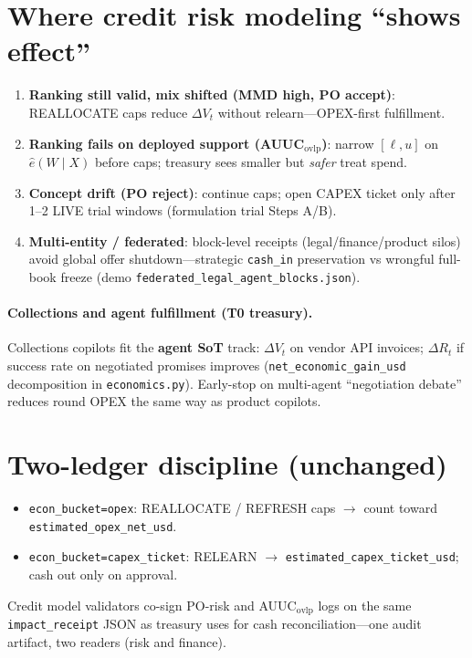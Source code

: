 \documentclass[11pt]{article}
\begin{document}
\section{Where credit risk modeling ``shows effect''}
\begin{enumerate}[nosep]
  \item \textbf{Ranking still valid, mix shifted (MMD high, PO accept)}: REALLOCATE caps reduce $\Delta V_t$ without relearn---OPEX-first fulfillment.
  \item \textbf{Ranking fails on deployed support (AUUC$_{\mathrm{ovlp}}$)}: narrow $[\ell,u]$ on $\hat e(W\mid X)$ before caps; treasury sees smaller but \emph{safer} treat spend.
  \item \textbf{Concept drift (PO reject)}: continue caps; open CAPEX ticket only after 1--2 LIVE trial windows (formulation trial Steps A/B).
  \item \textbf{Multi-entity / federated}: block-level receipts (legal/finance/product silos) avoid global offer shutdown---strategic \texttt{cash\_in} preservation vs wrongful full-book freeze (demo \texttt{federated\_legal\_agent\_blocks.json}).
\end{enumerate}

\paragraph{Collections and agent fulfillment (T0 treasury).}
Collections copilots fit the \textbf{agent SoT} track: $\Delta V_t$ on vendor API invoices; $\Delta R_t$ if success rate on negotiated promises improves (\texttt{net\_economic\_gain\_usd} decomposition in \texttt{economics.py}).
Early-stop on multi-agent ``negotiation debate'' reduces round OPEX the same way as product copilots.

\section{Two-ledger discipline (unchanged)}
\begin{itemize}[nosep]
  \item \texttt{econ\_bucket=opex}: REALLOCATE / REFRESH caps $\rightarrow$ count toward \texttt{estimated\_opex\_net\_usd}.
  \item \texttt{econ\_bucket=capex\_ticket}: RELEARN $\rightarrow$ \texttt{estimated\_capex\_ticket\_usd}; cash out only on approval.
\end{itemize}
Credit model validators co-sign PO-risk and AUUC$_{\mathrm{ovlp}}$ logs on the same \texttt{impact\_receipt} JSON as treasury uses for cash reconciliation---one audit artifact, two readers (risk and finance).
\end{document}
